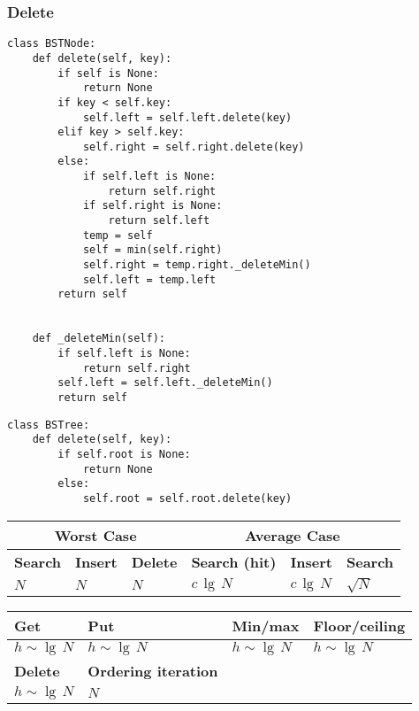 \documentclass[a4paper]{article}
\begin{document}
\subsubsection*{Delete}
\begin{lstlisting}
class BSTNode:
    def delete(self, key):
        if self is None:
            return None
        if key < self.key:
            self.left = self.left.delete(key)
        elif key > self.key:
            self.right = self.right.delete(key)
        else:
            if self.left is None:
                return self.right
            if self.right is None:
                return self.left
            temp = self
            self = min(self.right)
            self.right = temp.right._deleteMin()
            self.left = temp.left
        return self

            
    def _deleteMin(self):
        if self.left is None:
            return self.right
        self.left = self.left._deleteMin()
        return self
\end{lstlisting}
\begin{lstlisting}
class BSTree:
    def delete(self, key):
        if self.root is None:
            return None
        else:
            self.root = self.root.delete(key)
\end{lstlisting}
\begin{spacing}{1.5}
\begin{tabularx}{1\textwidth}{|X|X|X|X|X|X|}
    \hline
    \multicolumn{3}{|c|}{\textbf{Worst Case}} &\multicolumn{3}{c|}{\textbf{Average Case}}\\
    \hline
    \textbf{Search} & \textbf{Insert} & \textbf{Delete} & \textbf{Search (hit)} & \textbf{Insert} & \textbf{Search}\\
    \hline
    $N$&$N$&$N$&$c\,\lg\,N$&$c\,\lg\,N$&$\sqrt{N}$\\
    \hline
\end{tabularx}
\end{spacing}

\begin{spacing}{1.5}
\begin{tabularx}{1\textwidth}{|X|X|X|X|}
    \hline
    \textbf{Get} & \textbf{Put} & \textbf{Min/max} & \textbf{Floor/ceiling}\\
    \hline
    $h\sim \lg\,N$&$h\sim \lg\,N$&$h\sim \lg\,N$&$h\sim \lg\,N$\\
    \hline
    \textbf{Delete} & \textbf{Ordering iteration}&&\\
    \hline
    $h\sim \lg\,N$&$N$&&\\
    \hline
\end{tabularx}
\end{spacing}
\end{document}
